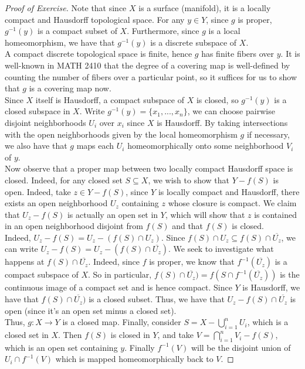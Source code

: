 \documentclass{article}
\begin{document}
\begin{proof}[Proof of Exercise]
   Note that since $X$ is a surface (manifold), it is a locally compact and Hausdorff topological space. For any $y \in Y$, since $g$ is proper, $g^{-1}(y)$ is a compact subset of $X$. Furthermore, since $g$ is a local homeomorphism, we have that $g^{-1}(y)$ is a discrete subspace of $X$.\\

   A compact discrete topological space is finite, hence $g$ has finite fibers over $y$. It is well-known in MATH 2410 that the degree of a covering map is well-defined by counting the number of fibers over a particular point, so it suffices for us to show that $g$ is a covering map now.\\
   
   Since $X$ itself is Hausdorff, a compact subspace of $X$ is closed, so $g^{-1}(y)$ is a closed subspace in $X$. Write $g^{-1}(y) = \{x_1, ..., x_n\}$, we can choose pairwise disjoint neighborhoods $U_i$ over $x_i$ since $X$ is Hausdorff. By taking intersections with the open neighborhoods given by the local homeomorphism $g$ if necessary, we also have that $g$ maps each $U_i$ homeomorphically onto some neighborhood $V_i$ of $y$.\\

   Now observe that a proper map between two locally compact Hausdorff space is closed. Indeed, for any closed set $S \subseteq X$, we wish to show that $Y - f(S)$ is open. Indeed, take $z \in Y - f(S)$, since $Y$ is locally compact and Hausdorff, there exists an open neighborhood $U_z$ containing $z$ whose closure is compact. We claim that $U_z - f(S)$ is actually an open set in $Y$, which will show that $z$ is contained in an open neighborhood disjoint from $f(S)$ and that $f(S)$ is closed.\\
   
   Indeed, $U_z - f(S) = U_z - (f(S) \cap U_z)$. Since $f(S) \cap U_z \subseteq f(S) \cap \overline{U_z}$, we can write $U_z - f(S) = U_z - (f(S) \cap \overline{U_z})$. We seek to investigate what happens at $f(S) \cap \overline{U_z}$. Indeed, since $f$ is proper, we know that $f^{-1}(\overline{U_z})$ is a compact subspace of $X$. So in particular, $f(S) \cap \overline{U_z}) = f(S \cap f^{-1}(\overline{U_z}))$ is the continuous image of a compact set and is hence compact. Since $Y$ is Hausdorff, we have that $f(S) \cap \overline{U_z})$ is a closed subset. Thus, we have that $U_z - f(S) \cap \overline{U_z}$ is open (since it's an open set minus a closed set).\\

   Thus, $g: X \to Y$ is a closed map. Finally, consider $S = X - \bigcup_{i = 1}^n U_i$, which is a closed set in $X$. Then $f(S)$ is closed in $Y$, and take $V = \bigcap_{i = 1}^n V_i - f(S)$, which is an open set containing $y$. Finally $f^{-1}(V)$ will be the disjoint union of $U_i \cap f^{-1}(V)$ which is mapped homeomorphically back to $V$.
\end{proof}
\end{document}
